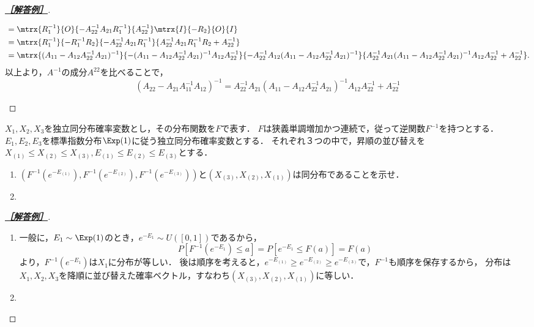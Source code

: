 \documentclass[uplatex,dvipdfmx]{jsarticle}
\begin{document}
\begin{proof}[\textbf{\underline{［解答例］}}]
\begin{enumerate}
\begin{align*}
            &=\mtrx{R_1^{-1}}{O}{-A_{22}^{-1}A_{21}R_1^{-1}}{A_{22}^{-1}}\mtrx{I}{-R_2}{O}{I}\\
            &=\mtrx{R_1^{-1}}{-R_1^{-1}R_2}{-A_{22}^{-1}A_{21}R_1^{-1}}{A_{22}^{-1}A_{21}R_1^{-1}R_2+A_{22}^{-1}}\\
            &=\mtrx{(A_{11}-A_{12}A_{22}^{-1}A_{21})^{-1}}{-(A_{11}-A_{12}A_{22}^{-1}A_{21})^{-1}A_{12}A_{22}^{-1}}{-A_{22}^{-1}A_{12}(A_{11}-A_{12}A_{22}^{-1}A_{21})^{-1}}{A_{22}^{-1}A_{21}(A_{11}-A_{12}A_{22}^{-1}A_{21})^{-1}A_{12}A_{22}^{-1}+A_{22}^{-1}}.
        \end{align*}
        以上より，$A^{-1}$の成分$A^{22}$を比べることで，
        \[(A_{22}-A_{21}A_{11}^{-1}A_{12})^{-1}=A_{22}^{-1}A_{21}(A_{11}-A_{12}A_{22}^{-1}A_{21})^{-1}A_{12}A_{22}^{-1}+A_{22}^{-1}\]
    \end{enumerate}
\end{proof}

\begin{tcolorbox}[colframe=ForestGreen, colback=ForestGreen!10!white,breakable,colbacktitle=ForestGreen!40!white,coltitle=black,fonttitle=\bfseries\sffamily,
    title=第４問]
    $X_1,X_2,X_3$を独立同分布確率変数とし，その分布関数を$F$で表す．
    $F$は狭義単調増加かつ連続で，従って逆関数$F^{-1}$を持つとする．
    $E_1,E_2,E_3$を標準指数分布$\Exp(1)$に従う独立同分布確率変数とする．
    それぞれ３つの中で，昇順の並び替えを$X_{(1)}\le X_{(2)}\le X_{(3)},E_{(1)}\le E_{(2)}\le E_{(3)}$とする．
    \begin{enumerate}
        \item $(F^{-1}(e^{-E_{(1)}}),F^{-1}(e^{-E_{(2)}}),F^{-1}(e^{-E_{(3)}}))$と$(X_{(3)},X_{(2)},X_{(1)})$は同分布であることを示せ．
        \item 
    \end{enumerate}
\end{tcolorbox}
\begin{proof}[\textbf{\underline{［解答例］}}]\mbox{}
    \begin{enumerate}
        \item 一般に，$E_1\sim\Exp(1)$のとき，$e^{-E_1}\sim U([0,1])$であるから，
        \[P[F^{-1}(e^{-E_1})\le a]=P[e^{-E_1}\le F(a)]=F(a)\]
        より，$F^{-1}(e^{-E_1})$は$X_1$に分布が等しい．
        後は順序を考えると，$e^{-E_{(1)}}\ge e^{-E_{(2)}}\ge e^{-E_{(3)}}$で，$F^{-1}$も順序を保存するから，
        分布は$X_1,X_2,X_3$を降順に並び替えた確率ベクトル，すなわち$(X_{(3)},X_{(2)},X_{(1)})$に等しい．
        \item 
    \end{enumerate}
\end{proof}
\end{document}
